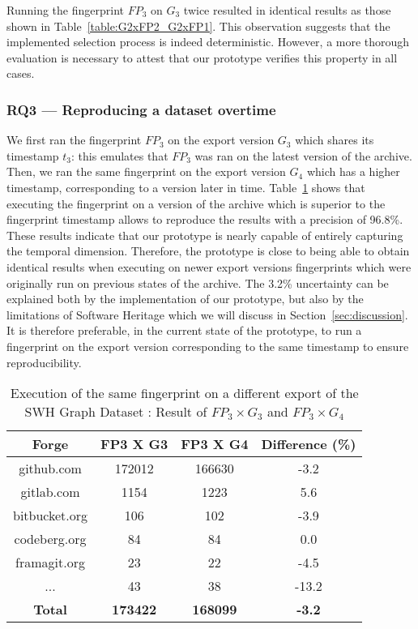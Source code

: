 Running the fingerprint $FP_3$ on  $G_3$  twice resulted in identical results as those shown in Table~\ref{table:G2xFP2_G2xFP1}.
This observation suggests that the implemented selection process is indeed deterministic. 
However, a more thorough evaluation is necessary to attest that our prototype verifies this property in all cases. 

\subsubsection{\textbf{RQ3 — Reproducing a dataset overtime}}

We first ran the fingerprint $FP_3$ on the export version $G_3$ which shares its timestamp $t_3$: this emulates that $FP_3$ was ran on the latest version of the archive.
Then, we ran the same fingerprint on the export version $G_4$ which has a higher timestamp, corresponding to a version later in time.
Table~\ref{table:RQ3} shows that executing the fingerprint on a version of the archive which is superior to the fingerprint timestamp allows to reproduce the results with a precision of 96.8\%.
These results indicate that our prototype is nearly capable of entirely capturing the temporal dimension. 
Therefore, the prototype is close to being able to obtain identical results when executing on newer export versions fingerprints which were originally run on previous states of the archive.
The 3.2\% uncertainty can be explained both by the implementation of our prototype, but also by the limitations of Software Heritage which we will discuss in Section~\ref{sec:discussion}.
It is therefore preferable, in the current state of the prototype, to run a fingerprint on the export version corresponding to the same timestamp to ensure reproducibility.

\begin{table}[ht]
\centering
\caption{Execution of the same fingerprint on a different export of the SWH Graph Dataset : Result of $FP_3 \times G_3$ and $FP_3 \times G_4$}
\vspace{-5 pt}

\begin{tabular}{ |c|c|c|c| }
\hline
 \textbf{Forge} & \textbf{FP3 X G3} & \textbf{FP3 X G4} & \textbf{Difference (\%)} \\
\hline
       github.com & 172012 & 166630 &            -3.2 \\
   gitlab.com &   1154 &   1223 &             5.6 \\
bitbucket.org &    106 &    102 &            -3.9 \\
 codeberg.org &     84 &     84 &             0.0 \\
 framagit.org &     23 &     22 &            -4.5 \\
          ... &     43 &     38 &           -13.2 \\
 \hline
\textbf{Total} & \textbf{173422} & \textbf{168099}& \textbf{-3.2} \\
 \hline
\end{tabular}
\label{table:RQ3}
\vspace{-1.5 em}

\end{table}
